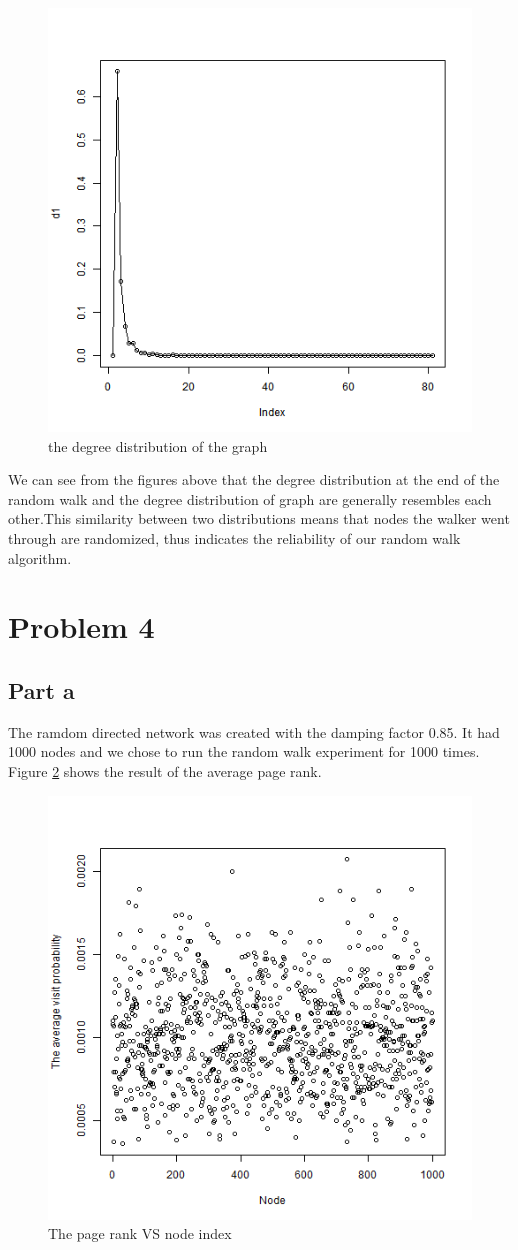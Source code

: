 \documentclass{article}
\begin{document}
\begin{figure}[htbp]
\centering
\includegraphics[width=.6\textwidth]{Q2a_1.png}
\caption{the degree distribution of the graph}
\label{fig:p2_e2}
\end{figure}
\noindent We can see from the figures above that the degree distribution at the end of the random walk and the degree distribution of graph are generally resembles each other.This similarity between two distributions means that nodes the walker went through are randomized, thus indicates the reliability of our random walk algorithm.

\section{Problem 4}
\subsection{Part a}
The ramdom directed network was created with the damping factor 0.85. It had 1000 nodes and we chose to run the random walk experiment for 1000 times. Figure \ref{fig:p4_a} shows the result of the average page rank.
\begin{figure}[htbp]
\centering
\includegraphics[width=.6\textwidth]{p4_a.png}
\caption{The page rank VS node index}
\label{fig:p4_a}
\end{figure}
\end{document}
